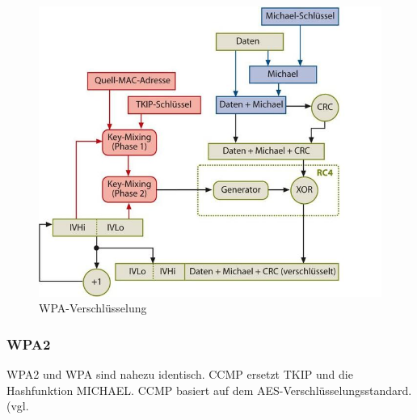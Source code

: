 \begin{figure} [htb]
\begin{centering}
\includegraphics[scale=0.6]{Bilder/wpa_funktionsweise.jpg}
\caption[WPA-Verschlüsselung]{WPA-Verschlüsselung \cite{Heise-WLAN}}
\label{wpa_funktionsweise}
\end{centering}
\end{figure}

\subsubsection{\ac{WPA2}}
\ac{WPA2} und \ac{WPA} sind nahezu identisch. \ac{CCMP} ersetzt \ac{TKIP} und die Hashfunktion MICHAEL. \ac{CCMP} basiert auf dem \ac{AES}-Verschlüsselungsstandard. (vgl. \cite{WPA2}
